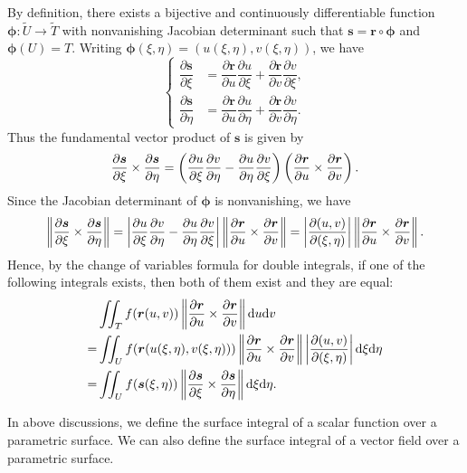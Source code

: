 \begin{proofenv}
    By definition, there exists a bijective and continuously differentiable function $\bm \phi: \widetilde U\to \widetilde T$ with nonvanishing Jacobian determinant such that $\bm s = \bm r\circ \bm \phi$ and $\bm \phi(U) = T$. Writing $\bm \phi(\xi, \eta) = (u(\xi,\eta), v(\xi,\eta))$, we have
    $$ \begin{cases}
        \dfrac{\partial \bm s}{\partial \xi} &= \dfrac{\partial \bm r}{\partial u}\dfrac{\partial u}{\partial \xi} + \dfrac{\partial \bm r}{\partial v}\dfrac{\partial v}{\partial \xi},\\[6pt]
        \dfrac{\partial \bm s}{\partial \eta} &= \dfrac{\partial \bm r}{\partial u}\dfrac{\partial u}{\partial \eta} + \dfrac{\partial \bm r}{\partial v}\dfrac{\partial v}{\partial \eta}.
    \end{cases} $$
    Thus the fundamental vector product of $\bm s$ is given by
    $$ \pdv{\bm s}{\xi}\times \pdv{\bm s}{\eta} = \left( \pdv{u}{\xi}\pdv{v}{\eta} - \pdv{u}{\eta}\pdv{v}{\xi} \right) \left( \pdv{\bm r}{u}\times \pdv{\bm r}{v} \right). $$
    Since the Jacobian determinant of $\bm \phi$ is nonvanishing, we have
    $$ \left\| \pdv{\bm s}{\xi}\times \pdv{\bm s}{\eta} \right\| = \left| \pdv{u}{\xi}\pdv{v}{\eta} - \pdv{u}{\eta}\pdv{v}{\xi} \right| \left\| \pdv{\bm r}{u}\times \pdv{\bm r}{v} \right\| = \left| \frac{\partial\!\left(u,v\right)}{\partial\!\left(\xi,\eta\right)} \right| \left\| \pdv{\bm r}{u}\times \pdv{\bm r}{v} \right\|. $$
    Hence, by the change of variables formula for double integrals, if one of the following integrals exists, then both of them exist and they are equal:
    $$ \begin{aligned}
        &\iint_T f(\bm r(u,v)) \left\| \pdv{\bm r}{u}\times \pdv{\bm r}{v} \right\| \dd u \dd v\\
        =& \iint_U f(\bm r(u(\xi,\eta), v(\xi,\eta))) \left\| \pdv{\bm r}{u}\times \pdv{\bm r}{v} \right\| \left| \frac{\partial\!\left(u,v\right)}{\partial\!\left(\xi,\eta\right)} \right| \dd \xi \dd \eta\\
        =& \iint_U f(\bm s(\xi,\eta)) \left\| \pdv{\bm s}{\xi}\times \pdv{\bm s}{\eta} \right\| \dd \xi \dd \eta.
    \end{aligned} $$
\end{proofenv}
\begin{remarkenv}
    In above discussions, we define the surface integral of a scalar function over a parametric surface. We can also define the surface integral of a vector field over a parametric surface.
\end{remarkenv}
